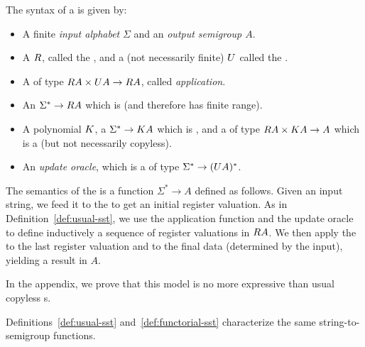 \begin{definition}\label{def:functorial-sst}
    The syntax of a  is given by:
    \begin{itemize}
        \item A finite \emph{input alphabet} $\Sigma$ and an \emph{output semigroup $A$}.
    \item A  $\functorr$, called the , and a (not necessarily finite)  $\functoru$ called the .
    \item A  of type $\functorr A \times \functoru A \to \functorr A$, called \emph{application}.
    \item An  $\Sigma^* \to \functorr A$ which is  (and therefore has finite range).
    \item A polynomial  $\functork$, a  $\Sigma^* \to \functork A$ which is , and a  of type $\functorr A \times \functork A \to A$ which is a  (but not necessarily copyless).
    \item An \emph{update oracle}, which is a  of type $\Sigma^* \to (\functoru A)^*$.
    \end{itemize}
\end{definition}
The semantics of the \functorialsst is a function 
$\Sigma^* \to A$ defined as follows. Given an input string, we feed it to the
 to get an initial register valuation. As in
Definition~\ref{def:usual-sst}, we use the application function and the update
oracle to define inductively a sequence of register valuations in $\functorr A$.
We then apply the  to the last register valuation and to the
final data (determined by the input), yielding a result in $A$.

In the appendix, we prove that this model is no more expressive than usual copyless \sst{}s.

\begin{lemma}\label{lem:functorial-sst-complete}
    Definitions~\ref{def:usual-sst} and~\ref{def:functorial-sst} characterize the same string-to-semigroup functions.
\end{lemma}
